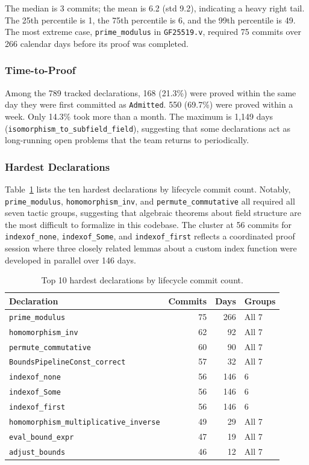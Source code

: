 \documentclass[11pt]{article}
\begin{document}
The median is 3 commits; the mean is 6.2 (std 9.2), indicating a heavy right tail. The 25th percentile is 1, the 75th percentile is 6, and the 99th percentile is 49. The most extreme case, \texttt{prime\_modulus} in \texttt{GF25519.v}, required 75 commits over 266 calendar days before its proof was completed.

\subsubsection{Time-to-Proof}

Among the 789 tracked declarations, 168 (21.3\%) were proved within the same day they were first committed as \texttt{Admitted}. 550 (69.7\%) were proved within a week. Only 14.3\% took more than a month. The maximum is 1,149 days (\texttt{isomorphism\_to\_subfield\_field}), suggesting that some declarations act as long-running open problems that the team returns to periodically.

\subsubsection{Hardest Declarations}

Table~\ref{tab:hardest} lists the ten hardest declarations by lifecycle commit count. Notably, \texttt{prime\_modulus}, \texttt{homomorphism\_inv}, and \texttt{permute\_commutative} all required all seven tactic groups, suggesting that algebraic theorems about field structure are the most difficult to formalize in this codebase. The cluster at 56 commits for \texttt{indexof\_none}, \texttt{indexof\_Some}, and \texttt{indexof\_first} reflects a coordinated proof session where three closely related lemmas about a custom index function were developed in parallel over 146 days.

\begin{table}[h]
\centering
\caption{Top 10 hardest declarations by lifecycle commit count.}
\label{tab:hardest}
\begin{tabular}{lrrl}
\toprule
Declaration & Commits & Days & Groups \\
\midrule
\texttt{prime\_modulus} & 75 & 266 & All 7 \\
\texttt{homomorphism\_inv} & 62 & 92 & All 7 \\
\texttt{permute\_commutative} & 60 & 90 & All 7 \\
\texttt{BoundsPipelineConst\_correct} & 57 & 32 & All 7 \\
\texttt{indexof\_none} & 56 & 146 & 6 \\
\texttt{indexof\_Some} & 56 & 146 & 6 \\
\texttt{indexof\_first} & 56 & 146 & 6 \\
\texttt{homomorphism\_multiplicative\_inverse} & 49 & 29 & All 7 \\
\texttt{eval\_bound\_expr} & 47 & 19 & All 7 \\
\texttt{adjust\_bounds} & 46 & 12 & All 7 \\
\bottomrule
\end{tabular}
\end{table}
\end{document}
